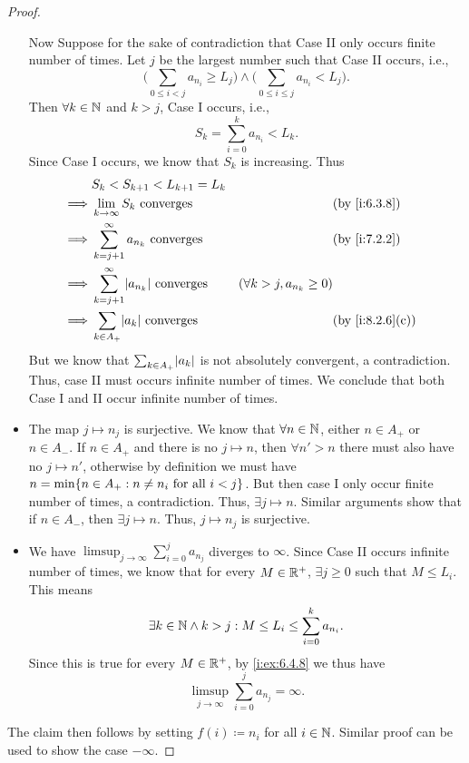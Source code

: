 \begin{proof}
\begin{itemize}
          Now Suppose for the sake of contradiction that Case II only occurs finite number of times.
          Let \(j\) be the largest number such that Case II occurs, i.e.,
          \[
            \Bigg(\sum_{0 \leq i < j} a_{n_i} \geq L_j\Bigg) \land \Bigg(\sum_{0 \leq i \leq j} a_{n_i} < L_j\Bigg).
          \]
          Then \(\forall k \in \mathbb{N}\) and \(k > j\), Case I occurs, i.e.,
          \[
            S_k = \sum_{i = 0}^k a_{n_i} < L_k.
          \]
          Since Case I occurs, we know that \(S_k\) is increasing.
          Thus
          \begin{align*}
                     & S_k < S_{k + 1} < L_{k + 1} = L_k                                                                           \\
            \implies & \lim_{k \to \infty} S_k \text{ converges}               &                                 & \by{i:6.3.8}    \\
            \implies & \sum_{k = j + 1}^\infty a_{n_k} \text{ converges}       &                                 & \by{i:7.2.2}    \\
            \implies & \sum_{k = j + 1}^\infty \abs{a_{n_k}} \text{ converges} & (\forall k > j, a_{n_k} \geq 0)                   \\
            \implies & \sum_{k \in A_+} \abs{a_k} \text{ converges}            &                                 & \by{i:8.2.6}[c]
          \end{align*}
          But we know that \(\sum_{k \in A_+} \abs{a_k}\) is not absolutely convergent, a contradiction.
          Thus, case II must occurs infinite number of times.
          We conclude that both Case I and II occur infinite number of times.
    \item The map \(j \mapsto n_j\) is surjective.
          We know that \(\forall n \in \mathbb{N}\), either \(n \in A_+\) or \(n \in A_-\).
          If \(n \in A_+\) and there is no \(j \mapsto n\), then \(\forall n' > n\) there must also have no \(j \mapsto n'\), otherwise by definition we must have \(n = \min\set{n \in A_+ : n \neq n_i \text{ for all } i < j}\).
          But then case I only occur finite number of times, a contradiction.
          Thus, \(\exists j \mapsto n\).
          Similar arguments show that if \(n \in A_-\), then \(\exists j \mapsto n\).
          Thus, \(j \mapsto n_j\) is surjective.
    \item We have \(\limsup_{j \to \infty} \sum_{i = 0}^j a_{n_j}\) diverges to \(\infty\).
          Since Case II occurs infinite number of times, we know that for every \(M \in \mathbb{R}^+\), \(\exists j \geq 0\) such that \(M \leq L_i\).
          This means
          \[
            \exists k \in \mathbb{N} \land k > j : M \leq L_i \leq \sum_{i = 0}^k a_{n_i}.
          \]
          Since this is true for every \(M \in \mathbb{R}^+\), by \cref{i:ex:6.4.8} we thus have
          \[
            \limsup_{j \to \infty} \sum_{i = 0}^j a_{n_j} = \infty.
          \]
  \end{itemize}
  The claim then follows by setting \(f(i) \coloneqq n_i\) for all \(i \in \mathbb{N}\).
  Similar proof can be used to show the case \(-\infty\).
\end{proof}

